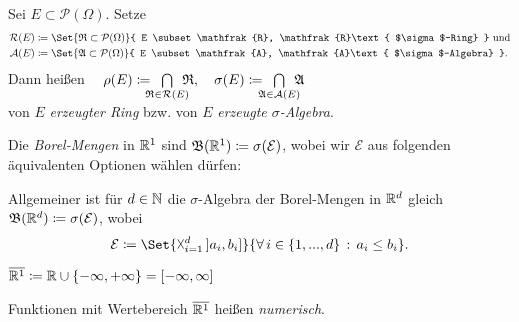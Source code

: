 \documentclass{cheat-sheet}
\newcommand{\Alg}{\mathfrak{A}} %
\newcommand{\Ring}{\mathfrak{R}} %
\newcommand{\Bor}{\mathfrak{B}} %
\renewcommand{\ER}{\overline{\R^1}} %
\begin{document}
\begin{defn}
  Sei $E \subset \mathcal{P}(\Omega)$. Setze
  \begin{align*}
    \mathcal{R}(E) &\coloneqq \Set{ \Ring \subset \mathcal{P}(\Omega) }{ E \subset \Ring, \Ring \text{ $\sigma$-Ring} } \text{ und} \\
    \mathcal{A}(E) &\coloneqq \Set{ \Alg \subset \mathcal{P}(\Omega) }{ E \subset \Alg, \Alg \text{ $\sigma$-Algebra} }.
  \end{align*}
  Dann heißen $\quad\rho(E) \coloneqq \enspace \bigcap_{\mathclap{\Ring \in \mathcal{R}(E)}} \enspace \Ring, \quad \sigma(E) \coloneqq \enspace \bigcap_{\mathclap{\Alg  \in \mathcal{A}(E)}} \enspace \Alg$\\
  von $E$ \emph{erzeugter Ring} bzw. von $E$ \emph{erzeugte $\sigma$-Algebra}.
\end{defn}

\begin{defn}
  Die \emph{Borel-Mengen} in $\mathbb{R}^1$ sind $\Bor(\R^1) \coloneqq \sigma(\mathcal{E})$, wobei wir $\mathcal{E}$ aus folgenden äquivalenten Optionen wählen dürfen:
  \begin{itemize}
    \miniitem{0.26\linewidth}{$\Set{ \left] a, b \right] }{ a \leq b }$}
    \miniitem{0.26\linewidth}{$\Set{ \left] a, b \right[ }{ a \leq b }$}
    \miniitem{0.26\linewidth}{$\Set{ \left[ a, b \right[ }{ a \leq b }$}
  \end{itemize}
\end{defn}

\begin{defn}
  Allgemeiner ist für $d \in \mathbb{N}$ die $\sigma$-Algebra der Borel-Mengen in $\mathbb{R}^d$ gleich $\Bor(\R^d) \coloneqq \sigma(\mathcal{E})$, wobei
  \[ \mathcal{E} \coloneqq \Set{ \vartimes_{i=1}^d \left] a_i, b_i \right] }{ \fa{i \in \{1, ..., d\}} a_i \leq b_i }. \]
\end{defn}


\begin{nota}
  $\ER \coloneqq \R \cup \{-\infty, +\infty\} = \left[ -\infty, \infty \right]$
\end{nota}

\begin{defn}
  Funktionen mit Wertebereich $\ER$ heißen \emph{numerisch}.
\end{defn}
\end{document}
